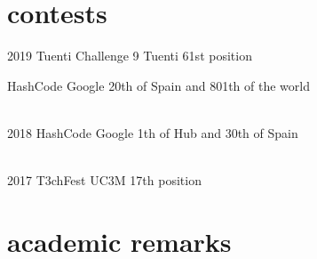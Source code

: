 \documentclass{friggeri-cv}
\begin{document}
  \section{contests}

    \begin{entrylist}

      \entry
      {2019}
      {Tuenti Challenge 9}
      {Tuenti}
      {61st position}

      \entry
      {}
      {HashCode}
      {Google}
      {20th of Spain and 801th of the world}

      \\
      \entry
      {2018}
      {HashCode}
      {Google}
      {1th of Hub and 30th of Spain}

      \\
      \entry
      {2017}
      {T3chFest}
      {UC3M}
      {17th position}

    \end{entrylist}



  \section{academic remarks}
\end{document}
